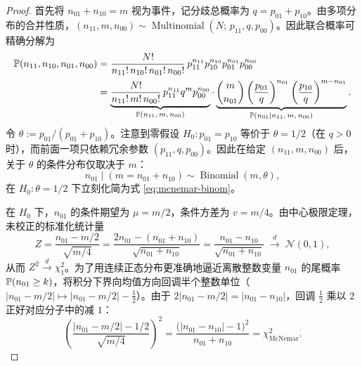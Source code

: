 \begin{proof}
首先将 $n_{01} + n_{10} = m$ 视为事件，记分歧总概率为 $q = p_{01} + p_{10}$。由多项分布的合并性质，$(n_{11}, m, n_{00}) \sim \operatorname{Multinomial}(N;\, p_{11}, q, p_{00})$。因此联合概率可精确分解为
\begin{align*}
  \mathbb{P}(n_{11}, n_{10}, n_{01}, n_{00})
  &= \frac{N!}{n_{11}!\, n_{10}!\, n_{01}!\, n_{00}!}\, p_{11}^{n_{11}} p_{10}^{n_{10}} p_{01}^{n_{01}} p_{00}^{n_{00}} \\
  &= \underbrace{\frac{N!}{n_{11}!\, m!\, n_{00}!}\, p_{11}^{n_{11}} q^m p_{00}^{n_{00}}}_{\mathbb{P}(n_{11},\, m,\, n_{00})}
     \cdot \underbrace{\binom{m}{n_{01}} \left(\frac{p_{01}}{q}\right)^{n_{01}} \left(\frac{p_{10}}{q}\right)^{m-n_{01}}}_{\mathbb{P}(n_{01} \mid n_{11},\, m,\, n_{00})}.
\end{align*}
令 $\theta := p_{01} / (p_{01} + p_{10})$。注意到零假设 $H_0: p_{01} = p_{10}$ 等价于 $\theta = 1/2$（在 $q>0$ 时），而前面一项只依赖冗余参数 $(p_{11}, q, p_{00})$。因此在给定 $(n_{11}, m, n_{00})$ 后，关于 $\theta$ 的条件分布仅取决于 $m$：
\[
  n_{01} \mid (m = n_{01}+n_{10}) \sim \operatorname{Binomial}(m, \theta),
\]
在 $H_0: \theta = 1/2$ 下立刻化简为式 \eqref{eq:mcnemar-binom}。

在 $H_0$ 下，$n_{01}$ 的条件期望为 $\mu = m/2$，条件方差为 $v = m/4$。由中心极限定理，未校正的标准化统计量
\[
  Z = \frac{n_{01} - m/2}{\sqrt{m/4}} = \frac{2n_{01} - (n_{01} + n_{10})}{\sqrt{n_{01} + n_{10}}} = \frac{n_{01} - n_{10}}{\sqrt{n_{01} + n_{10}}} \;\xrightarrow{\,d\,}\; \mathcal{N}(0,1),
\]
从而 $Z^2 \xrightarrow{d} \chi^2_1$。为了用连续正态分布更准确地逼近离散整数变量 $n_{01}$ 的尾概率 $\mathbb{P}(n_{01} \ge k)$，将积分下界向均值方向回调半个整数单位（$|n_{01} - m/2| \mapsto |n_{01} - m/2| - \frac{1}{2}$）。由于 $2|n_{01} - m/2| = |n_{01} - n_{10}|$，回调 $\frac{1}{2}$ 乘以 $2$ 正好对应分子中的减 $1$：
\[
  \left(\frac{|n_{01} - m/2| - 1/2}{\sqrt{m/4}}\right)^2
  = \frac{\big(|n_{01} - n_{10}| - 1\big)^2}{n_{01} + n_{10}} = \chi^2_{\mathrm{McNemar}}.
\]
\end{proof}

